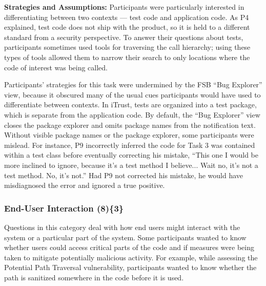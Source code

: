 \documentclass[10pt,journal,compsoc]{IEEEtran}
\begin{document}
\textbf{Strategies and Assumptions:}
Participants were particularly interested in differentiating between two contexts --- test code and application code. 
As P4 explained, test code does not ship with the product, so it is held to a different standard from a security perspective. 
To answer their questions about tests, participants sometimes used tools for traversing the call hierarchy; using these types of tools allowed them to narrow their search to only locations where the code of interest was being called.


Participants' strategies for this task were undermined by the FSB ``Bug Explorer'' view, because it obscured many of the usual cues participants would have used to differentiate between contexts.
In iTrust, tests are organized into a test package, which is separate from the application code. 
By default, the ``Bug Explorer'' view closes the package explorer and omits package names from the notification text.
Without visible package names or the package explorer, some participants were mislead.
For instance, P9 incorrectly inferred the code for Task 3 was contained within a test class before eventually correcting his mistake, 
``This one I would be more inclined to ignore, because it's a test method I believe... Wait no, it's not a test method. No, it's not.''
Had P9 not corrected his mistake, he would have misdiagnosed the error and ignored a true positive.







\subsubsection{End-User Interaction (8)\{3\}}

\label{eui}

Questions in this category deal with how end users might interact with the system or a particular part of the system. 
Some participants wanted to know whether users could access critical parts of the code and if measures were being taken to mitigate potentially malicious activity. 
For example, while assessing the Potential Path Traversal vulnerability, participants wanted to know whether the path is sanitized somewhere in the code before it is used.
\\
\end{document}
